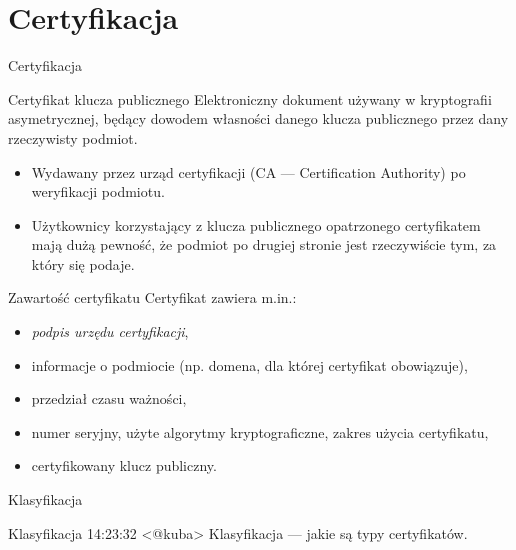 \section{Certyfikacja}

\begin{frame}{Certyfikacja}
	\begin{alertblock}{Certyfikat klucza publicznego}
		Elektroniczny dokument używany w kryptografii asymetrycznej, będący dowodem własności danego klucza publicznego przez dany rzeczywisty podmiot.
	\end{alertblock}
	\begin{itemize}
		\item Wydawany przez urząd certyfikacji (CA — Certification Authority) po weryfikacji podmiotu.
		\item Użytkownicy korzystający z klucza publicznego opatrzonego certyfikatem mają dużą pewność, że podmiot po drugiej stronie jest rzeczywiście tym, za który się podaje.
	\end{itemize}
\end{frame}

\begin{frame}{Zawartość certyfikatu}
	Certyfikat zawiera m.in.:
	\begin{itemize}
		\item \emph{podpis urzędu certyfikacji},
		\item informacje o podmiocie (np. domena, dla której certyfikat obowiązuje),
		\item przedział czasu ważności,
		\item numer seryjny, użyte algorytmy kryptograficzne, zakres użycia certyfikatu,
		\item certyfikowany klucz publiczny.
	\end{itemize}
\end{frame}

\begin{frame}{Klasyfikacja}
	\begin{alertblock}{Klasyfikacja}
		14:23:32 <@kuba> Klasyfikacja — jakie są typy certyfikatów.
	\end{alertblock}
\end{frame}
